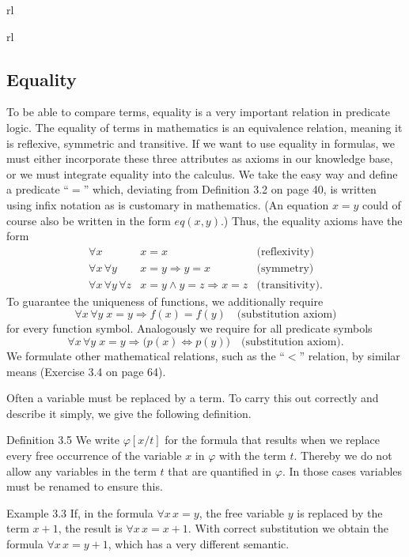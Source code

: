 \documentclass[10pt]{book}
\begin{document}
\begin{center}
\begin{tabular}{rl}
\begin{tabular}{rl}
\subsection{Equality}
To be able to compare terms, equality is a very important relation in predicate logic. The equality of terms in mathematics is an equivalence relation, meaning it is reflexive, symmetric and transitive. If we want to use equality in formulas, we must either incorporate these three attributes as axioms in our knowledge base, or we must integrate equality into the calculus. We take the easy way and define a predicate ``$=$'' which, deviating from Definition 3.2 on page 40, is written using infix notation as is customary in mathematics. (An equation $x=y$ could of course also be written in the form $eq(x,y)$.) Thus, the equality axioms have the form
\[
\begin{array}{rll}
\forall x & x=x & \text{(reflexivity)} \\
\forall x\,\forall y & x=y \Rightarrow y=x & \text{(symmetry)} \tag{3.1}\\
\forall x\,\forall y\,\forall z & x=y \wedge y=z \Rightarrow x=z & \text{(transitivity).}
\end{array}
\]
To guarantee the uniqueness of functions, we additionally require
\begin{equation*}
\forall x\,\forall y\; x=y \Rightarrow f(x)=f(y) \quad \text{(substitution axiom)} \tag{3.2}
\end{equation*}
for every function symbol. Analogously we require for all predicate symbols
\begin{equation*}
\forall x\,\forall y\; x=y \Rightarrow \bigl(p(x) \Leftrightarrow p(y)\bigr) \quad \text{(substitution axiom).} \tag{3.3}
\end{equation*}
We formulate other mathematical relations, such as the ``$<$'' relation, by similar means (Exercise 3.4 on page 64).

Often a variable must be replaced by a term. To carry this out correctly and describe it simply, we give the following definition.

Definition 3.5 We write $\varphi[x/t]$ for the formula that results when we replace every free occurrence of the variable $x$ in $\varphi$ with the term $t$. Thereby we do not allow any variables in the term $t$ that are quantified in $\varphi$. In those cases variables must be renamed to ensure this.

Example 3.3 If, in the formula $\forall x\, x=y$, the free variable $y$ is replaced by the term $x+1$, the result is $\forall x\, x=x+1$. With correct substitution we obtain the formula $\forall x\, x=y+1$, which has a very different semantic.


\end{tabular}
\end{tabular}
\end{center}
\end{document}
